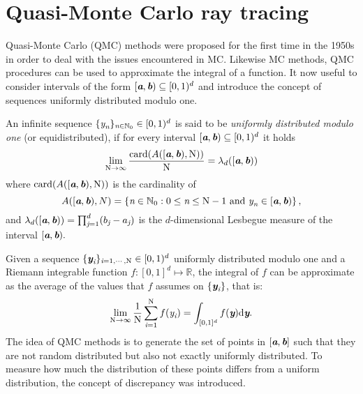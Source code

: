 \section{Quasi-Monte Carlo ray tracing}
Quasi-Monte Carlo (QMC) methods were proposed for the first time in the 1950s in order to deal with the issues encountered in MC.
Likewise MC methods, QMC procedures can be used to approximate the integral of a function. 
It now useful to consider intervals of the form $[\textit{\textbf{a}}, \textit{\textbf{b}})\subseteq[0,1)^d$ and introduce the concept of sequences uniformly distributed modulo one.
\begin{definition}
An infinite sequence $\{\textit{y}_{\textit{n}}\}_{\textit{n}\in\mathbb{N}_0} \in [0,1)^d$ is said to be \textit{uniformly distributed modulo one} (or equidistributed), if for every interval $[\textit{\textbf{a}},\textit{\textbf{b}})\subseteq[0,1)^d$ it holds
\begin{equation}
\lim_{\textrm{N}\rightarrow \infty}\frac{\textrm{card}(A([\textit{\textbf{a}},\textit{\textbf{b}}), \textrm{N}))}{\textrm{N}} = \lambda_d([\textit{\textbf{a}},\textit{\textbf{b}}))
\end{equation}
where $\textrm{card}(A([\textit{\textbf{a}},\textit{\textbf{b}}), \textrm{N}))$ is the cardinality of
\begin{equation}
A([\textit{\textbf{a}},\textit{\textbf{b}}), N) = \{\textit{n}\in \mathbb{N}_0: 0\leq\textit{n}\leq \textrm{N}-1 \mbox{ and } \textit{y}_{\textit{n}}\in [\textit{\textbf{a}},\textit{\textbf{b}})\}\,,
\end{equation}
and $\lambda_d([\textit{\textbf{a}},\textit{\textbf{b}})) = \prod_{\textit{j}=1}^{d}(b_{\textit{j}}-a_{\textit{j}})$ is the $d$-dimensional Lesbegue measure of the interval $[\textit{\textbf{a}},\textit{\textbf{b}}).$
\end{definition}
Given a sequence $\{\textit{\textbf{y}}_{\textit{i}}\}_{\textit{i} = 1, \cdots, \textrm{N}}\in[0,1)^d$ uniformly distributed modulo one and a 
Riemann integrable function $f:[0,1]^d\mapsto \mathbb{R}$, the integral of $f$ can be approximate as the average of the values that $f$ assumes on $\{\textit{\textbf{y}}_{\textit{i}}\}$, that is:
\begin{equation}
 \lim_{\textrm{N}\rightarrow \infty}\frac{1}{\textrm{N}}\sum_{\textit{i}=1}^{\textrm{N}}f(\textit{y}_{\textit{i}}) = \int_{[0,1]^d}f(\textit{\textbf{y}})\textrm{d}\textit{\textbf{y}}.
\end{equation}
The idea of QMC methods is to generate the set of points in $[\textit{\textbf{a}},\textit{\textbf{b}}]$ such that they are not random distributed but also not exactly uniformly distributed. 
To measure how much the distribution of these points differs from a uniform distribution, the concept of discrepancy was introduced. 
